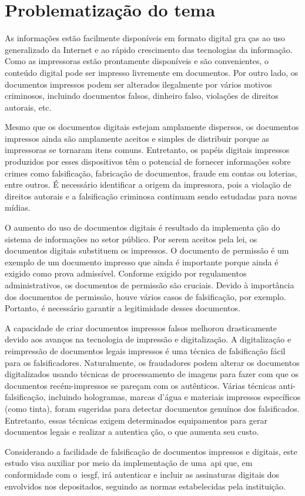 \section{Problematização do tema}

As informações estão facilmente disponíveis em formato digital gra
ças ao uso generalizado da Internet e ao rápido crescimento das
tecnologias da informação.
Como as impressoras estão prontamente disponíveis e são
convenientes, o conteúdo digital pode ser
impresso livremente em documentos.
Por outro lado, os documentos impressos podem ser alterados
ilegalmente por vários motivos criminosos, incluindo documentos
falsos, dinheiro falso, violações
de direitos autorais, etc\cite{tsai2019}.

Mesmo que os documentos digitais estejam amplamente dispersos, os
documentos impressos ainda são amplamente aceitos e simples de
distribuir porque as impressoras se tornaram itens comuns.
Entretanto, os papéis digitais impressos produzidos por esses
dispositivos têm o potencial de fornecer informações sobre crimes
como falsificação, fabricação de documentos, fraude em contas ou
loterias, entre outros.
É necessário identificar a origem da impressora, pois a violação de
direitos autorais e a falsificação criminosa continuam sendo
estudadas para novas mídias\cite{tsai2019}.

O aumento do uso de documentos digitais é resultado da implementa
ção do sistema de informações no setor público.
Por serem aceitos pela lei, os documentos digitais substituem os
impressos.
O documento de permissão é um exemplo de um documento impresso que
ainda é importante porque ainda é exigido como prova admissível.
Conforme exigido por regulamentos administrativos, os documentos de
permissão são cruciais.
Devido à importância dos documentos de permissão, houve vários
casos de falsificação, por exemplo.
Portanto, é necessário garantir a legitimidade desses documentos\cite{
    arief2019}.

A capacidade de criar documentos impressos falsos melhorou
drasticamente devido aos avanços na tecnologia de impressão e
digitalização.
A digitalização e reimpressão de documentos legais impressos é uma
técnica de falsificação fácil para os falsificadores.
Naturalmente, os fraudadores podem alterar os documentos
digitalizados usando técnicas de processamento de imagens para
fazer com que os documentos recém-impressos se pareçam
com os autênticos.
Várias técnicas anti-falsificação, incluindo hologramas, marcas
d'água e materiais impressos específicos (como tinta), foram
sugeridas para detectar documentos genuínos dos falsificados.
Entretanto, essas técnicas exigem determinados equipamentos para
gerar documentos legais e realizar a autentica ção, o que aumenta
seu custo\cite{zhang2019}.

Considerando a facilidade de falsificação de documentos impressos e digitais,
este estudo visa auxiliar por meio da implementação de uma~\acrshort{api} que,
em conformidade com o~\acrlong{iesgf}, irá autenticar e incluir as assinaturas
digitais dos envolvidos nos  depositados, seguindo as normas
estabelecidas pela instituição.